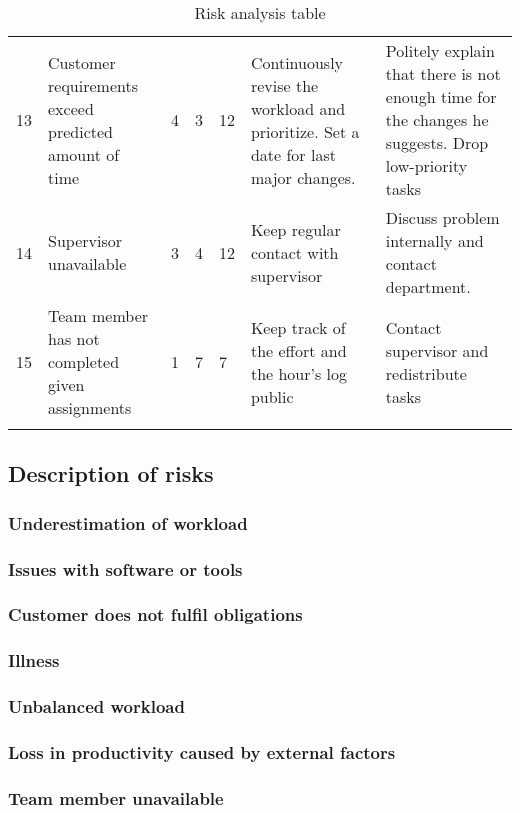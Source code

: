 \begin{longtable}{|p{0.5cm}!{\vrule width -1pt}p{3.6cm}!{\vrule width -1pt}l!{\vrule width -1pt}l!{\vrule width -1pt}l!{\vrule width -1pt}p{4.4cm}!{\vrule width -1pt}p{4.4cm}|}
13&Customer requirements exceed predicted amount of time& 4 & 3 & 12 & Continuously revise the workload and prioritize. Set a date for last major changes. & Politely explain that there is not enough time for the changes he suggests. Drop low-priority tasks\\
14&Supervisor unavailable & 3 & 4 & 12 & Keep regular contact with supervisor & Discuss problem internally and contact department.\\
15&Team member has not completed given assignments & 1 & 7 & 7 & Keep track of the effort and the hour's log public & Contact supervisor and redistribute tasks \\\hline
\caption{Risk analysis table}
\end{longtable}

\subsection{Description of risks}
\subsubsection{Underestimation of workload}
\subsubsection{Issues with software or tools}
\subsubsection{Customer does not fulfil obligations}
\subsubsection{Illness}
\subsubsection{Unbalanced workload}
\subsubsection{Loss in productivity caused by external factors}
\subsubsection{Team member unavailable}
